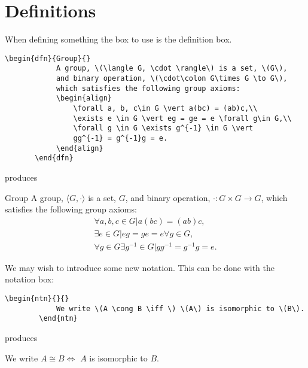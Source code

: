 \documentclass[fleqn, a4paper, openany]{memoir}
\begin{document}
    \section{Definitions}
    When defining something the box to use is the definition box.
    \begin{Verbatim}[gobble=2]
        \begin{dfn}{Group}{}
            A group, \(\langle G, \cdot \rangle\) is a set, \(G\), 
            and binary operation, \(\cdot\colon G\times G \to G\),
            which satisfies the following group axioms:
            \begin{align}
                \forall a, b, c\in G \vert a(bc) = (ab)c,\\
                \exists e \in G \vert eg = ge = e \forall g\in G,\\
                \forall g \in G \exists g^{-1} \in G \vert
                gg^{-1} = g^{-1}g = e.
            \end{align}
       \end{dfn}
    \end{Verbatim}
    produces
    \begin{dfn}{Group}{}
        A group, \(\langle G, \cdot \rangle\) is a set, \(G\), 
        and binary operation, \(\cdot\colon G\times G \to G\),
        which satisfies the following group axioms:
        \begin{align}
            \forall a, b, c\in G \vert a(bc) = (ab)c,\\
            \exists e \in G \vert eg = ge = e \forall g\in G,\\
            \forall g \in G \exists g^{-1} \in G \vert 
            gg^{-1} = g^{-1}g = e.
        \end{align}
    \end{dfn}

    We may wish to introduce some new notation.
    This can be done with the notation box:
    \begin{Verbatim}[gobble=2]
        \begin{ntn}{}{}
            We write \(A \cong B \iff \) \(A\) is isomorphic to \(B\).
        \end{ntn}
    \end{Verbatim}
    produces
    \begin{ntn}{}{}
        We write \(A \cong B \iff \) \(A\) is isomorphic to \(B\).
    \end{ntn}
\end{document}
